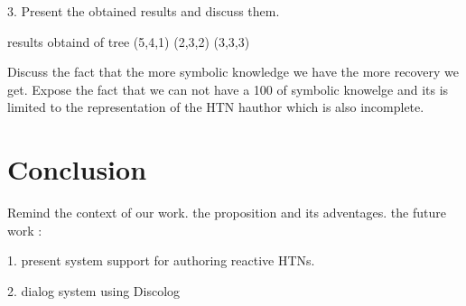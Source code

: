\documentclass[conference]{IEEEtran}
\begin{document}
		
		3. Present the obtained results and discuss them. 
		
		results obtaind of tree (5,4,1) (2,3,2) (3,3,3) 
		
		
		Discuss the fact that the more symbolic knowledge we have the more recovery we get. 
		Expose the fact that we can not have a 100 of symbolic knowelge and its is limited to the representation of the HTN hauthor which is also incomplete.
		
		\section{Conclusion}
		Remind the context of our work. the proposition and its adventages. the future work : 
		
		1. present system support  for authoring reactive HTNs. 
		
		
		2. dialog system using Discolog
		
		
		
		
		
		
\end{document}
